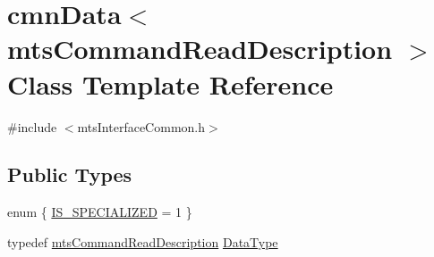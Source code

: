 \hypertarget{classcmn_data_3_01mts_command_read_description_01_4}{}\section{cmn\+Data$<$ mts\+Command\+Read\+Description $>$ Class Template Reference}
\label{classcmn_data_3_01mts_command_read_description_01_4}


{\ttfamily \#include $<$mts\+Interface\+Common.\+h$>$}

\subsection*{Public Types}
\begin{DoxyCompactItemize}
\item 
enum \{ \hyperlink{classcmn_data_3_01mts_command_read_description_01_4_ae9cb28769cb3b1a010947c51bcc0d52ea6a40e73c19f5856a03ff689158203d6d}{I\+S\+\_\+\+S\+P\+E\+C\+I\+A\+L\+I\+Z\+E\+D} = 1
 \}
\item 
typedef \hyperlink{classmts_command_read_description}{mts\+Command\+Read\+Description} \hyperlink{classcmn_data_3_01mts_command_read_description_01_4_a1ecbaf4ae55d2af19547b13a35e88618}{Data\+Type}
\end{DoxyCompactItemize}
